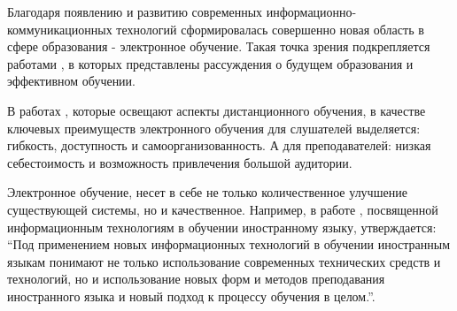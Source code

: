 \documentclass[%
  a5paper,
  subf,
  href,
  master,
  dotsinheaders 
]{csse-fcs}
\begin{document}

\makeabstractru


\tableofcontents

% 


\intro

Благодаря появлению и развитию современных информационно-коммуникационных технологий сформировалась совершенно новая область в сфере образования - электронное обучение. Такая точка зрения подкрепляется работами \cite{goyal2012learning, jethro2012learning}, в которых представлены рассуждения о будущем образования и эффективном обучении.

В работах \cite{pravodelov2015, borodickaya2017, alonceva2018creating, vaganova2017elecrt}, которые освещают аспекты дистанционного обучения, в качестве ключевых преимуществ электронного обучения для слушателей выделяется: гибкость, доступность и самоорганизованность. А для преподавателей: низкая себестоимость и возможность привлечения большой аудитории.

Электронное обучение, несет в себе не только количественное улучшение существующей системы, но и качественное. Например, в работе \cite{yarasheva2014}, посвященной информационным технологиям в обучении иностранному языку, утверждается:
“Под применением новых информационных технологий в обучении иностранным языкам понимают не только использование современных технических средств и технологий, но и использование новых форм и методов преподавания иностранного языка и новый подход к процессу обучения в целом.”.
\end{document}
